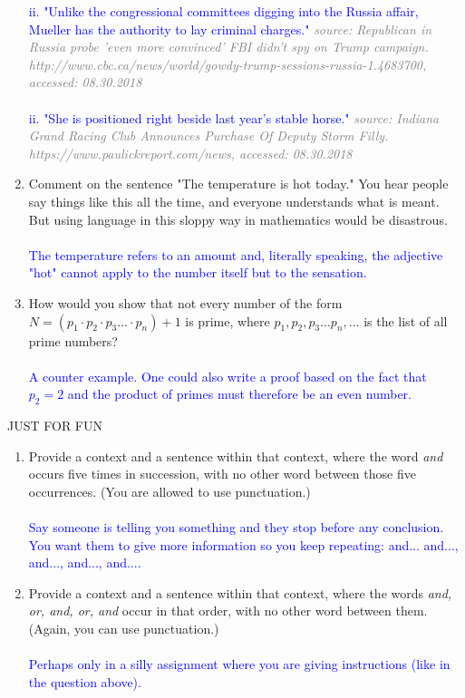 \documentclass[13.5pt]{article}
\begin{document}
\begin{enumerate}
\textcolor{blue}{ii. "Unlike the congressional committees digging into the Russia affair, Mueller has the authority to lay criminal charges."}
\textcolor{gray}{\textit{source: Republican in Russia probe 'even more convinced' FBI didn't spy on Trump campaign. http://www.cbc.ca/news/world/gowdy-trump-sessions-russia-1.4683700, accessed: 08.30.2018}}\\\\
\textcolor{blue}{ii. "She is positioned right beside last year's stable horse."}
\textcolor{gray}{\textit{source: Indiana Grand Racing Club Announces Purchase Of Deputy Storm Filly. https://www.paulickreport.com/news, accessed: 08.30.2018}}

\item{Comment on the sentence "The temperature is hot today." You hear people say things like this all the time, and everyone understands what is meant. But using language in this sloppy way in mathematics would be disastrous.}\\\\
\textcolor{blue}{The temperature refers to an amount and, literally speaking, the adjective "hot" cannot apply to the number itself but to the sensation. }

\item{How would you show that not every number of the form \(N=(p_1 \cdot p_2 \cdot p_3 ... \cdot p_n) + 1\)  is prime, where \(p_1,p_2,p_3...p_n,...\)  is the list of all prime numbers?}\\\\ \textcolor{blue}{A counter example. One could also write a proof based on the fact that \(p_2=2\) and the product of primes must therefore be an even number. }

\end{enumerate}

JUST FOR FUN

\begin{enumerate}

\item{Provide a context and a sentence within that context, where the word \textit{and} occurs five times in succession, with no other word between those five occurrences. (You are allowed to use punctuation.)}\\\\
\textcolor{blue}{Say someone is telling you something and they stop before any conclusion. You want them to give more information so you keep repeating: and... and..., and..., and..., and....}

\item{ Provide a context and a sentence within that context, where the words \textit{and, or, and, or, and} occur in that order, with no other word between them. (Again, you can use punctuation.)}\\\\
\textcolor{blue}{Perhaps only in a silly assignment where you are giving instructions (like in the question above).}
\end{enumerate}
\end{document}
